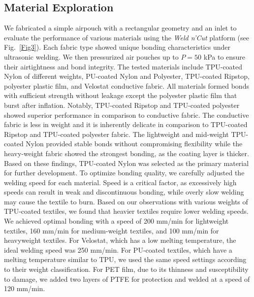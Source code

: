 \documentclass[journal, letterpaper]{IEEEtran}
\begin{document}
\subsection{Material Exploration}
We fabricated a simple airpouch with a rectangular geometry and an inlet to evaluate the performance of various materials using the \textit{Weld n'Cut} platform (see Fig.~\ref{Fig3}). Each fabric type showed unique bonding characteristics under ultrasonic welding. We then pressurized air pouches up to $P=50$ kPa to ensure their airtightness and bond integrity.
The tested materials include TPU-coated Nylon of different weights, PU-coated Nylon and Polyester, TPU-coated Ripstop, polyester plastic film, and Velostat conductive fabric.
All materials formed bonds with sufficient strength without leakage except the polyester plastic film that burst after inflation. Notably, TPU-coated Ripstop and TPU-coated polyester showed superior performance in comparison to conductive fabric. The conductive fabric is less in weight and it is inherently delicate in comparison to TPU-coated Ripstop and TPU-coated polyester fabric.
The lightweight and mid-weight TPU-coated Nylon provided stable bonds without compromising flexibility while the heavy-weight fabric showed the strongest bonding, as the coating layer is thicker. Based on these findings, TPU-coated Nylon was selected as the primary material for further development. 
To optimize bonding quality, we carefully adjusted the welding speed for each material. Speed is a critical factor, as excessively high speeds can result in weak and discontinuous bonding, while overly slow welding may cause the textile to burn. Based on our observations with various weights of TPU-coated textiles, we found that heavier textiles require lower welding speeds. We achieved optimal bonding with a speed of 200 mm/min for lightweight textiles, 160 mm/min for medium-weight textiles, and 100 mm/min for heavyweight textiles.
For Velostat, which has a low melting temperature, the ideal welding speed was 250 mm/min. For PU-coated textiles, which have a melting temperature similar to TPU, we used the same speed settings according to their weight classification. For PET film, due to its thinness and susceptibility to damage, we added two layers of PTFE for protection and welded at a speed of 120 mm/min.
\end{document}
